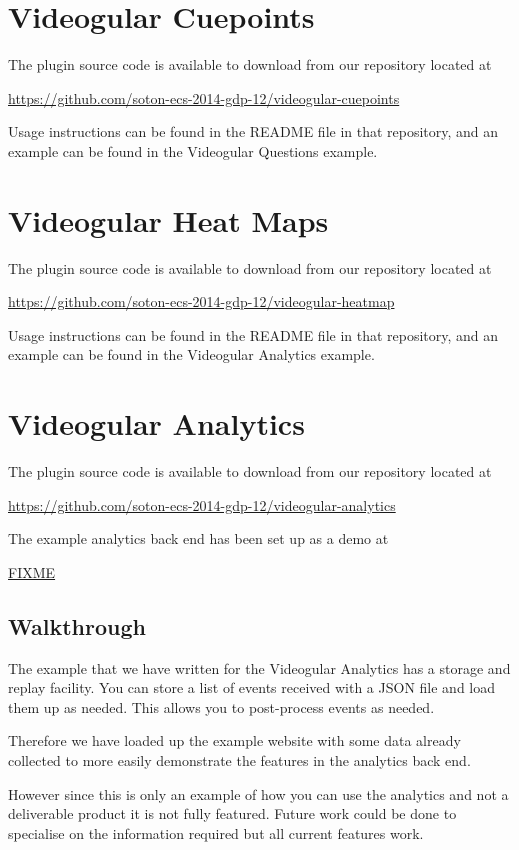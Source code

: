\documentclass[12pt,a4paper]{article}
\begin{document}
\section{Videogular Cuepoints}

The plugin source code is available to download from our repository located at

\url{https://github.com/soton-ecs-2014-gdp-12/videogular-cuepoints}

Usage instructions can be found in the README file in that repository, and an example can be found in the Videogular Questions example.

\section{Videogular Heat Maps}

The plugin source code is available to download from our repository located at

\url{https://github.com/soton-ecs-2014-gdp-12/videogular-heatmap}

Usage instructions can be found in the README file in that repository, and an example can be found in the Videogular Analytics example.

\section{Videogular Analytics}

The plugin source code is available to download from our repository located at

\url{https://github.com/soton-ecs-2014-gdp-12/videogular-analytics}

The example analytics back end has been set up as a demo at

\url{FIXME}

\subsection{Walkthrough}

The example that we have written for the Videogular Analytics has a storage and replay facility. You can store a list of events received with a JSON file and load them up as needed. This allows you to post-process events as needed.

Therefore we have loaded up the example website with some data already collected to more easily demonstrate the features in the analytics back end.

However since this is only an example of how you can use the analytics and not a deliverable product it is not fully featured. Future work could be done to specialise on the information required but all current features work.
\end{document}
